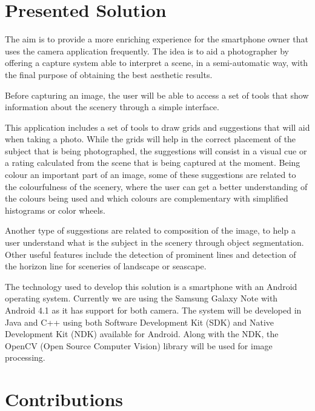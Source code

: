 \section{Presented Solution}
\label{sec:solution}

The aim is to provide a more enriching experience for the smartphone owner that uses the camera application frequently. The idea is to aid a photographer by offering a capture system able to interpret a scene, in a semi-automatic way, with the final purpose of obtaining the best aesthetic results.

Before capturing an image, the user will be able to access a set of tools that show information about the scenery through a simple interface.

This application includes a set of tools to draw grids and suggestions that will aid when taking a photo. While the grids will help in the correct placement of the subject that is being photographed, the suggestions will consist in a visual cue or a rating calculated from the scene that is being captured at the moment.
Being colour an important part of an image, some of these suggestions are related to the colourfulness of the scenery, where the user can get a better understanding of the colours being used and which colours are complementary with simplified histograms or color wheels.

Another type of suggestions are related to composition of the image, to help a user understand what is the subject in the scenery through object segmentation. Other useful features include the detection of prominent lines and detection of the horizon line for sceneries of landscape or seascape.

The technology used to develop this solution is a smartphone with an Android operating system. Currently we are using the Samsung Galaxy Note with Android 4.1 as it has support for both camera. The system will be developed in Java and C++ using both Software Development Kit (SDK) \cite{SDK} and Native Development Kit (NDK) \cite{NDK} available for Android.  Along with the NDK, the OpenCV (Open Source Computer Vision) \cite{OCV} library will be used for image processing.

\section{Contributions}
\label{sec:contributions}


